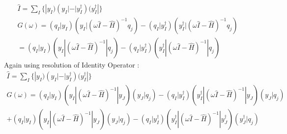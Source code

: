 \documentclass[11pt, oneside]{article}   	%
\begin{document}
\begin{equation*}\label{eq:resolution of identity}
  \begin{aligned}
    \hat I=\sum_I \{ |y_I)(y_I|-|y_I^\dagger)(y_I^\dagger|\}\\
    G(\omega)=(q_I|y_I)(y_I|(\omega \hat I - \hat H)^{-1}q_j) - (q_I|y_I^\dagger)(y_I^\dagger|(\omega \hat I - \hat H)^{-1}q_j)\\
    =(q_I|y_I)(y_I|(\omega \hat I - \hat H)^{-1}|q_j) - (q_I|y_I^\dagger)(y_I^\dagger|(\omega \hat I - \hat H)^{-1}|q_j)
  \end{aligned}
\end{equation*}
Again using resolution of Identity Operator : 
\begin{equation*}\label{eq:resolution of identity}
  \begin{aligned}
    \hat I=\sum_I \{ |y_I)(y_I|-|y_I^\dagger)(y_I^\dagger|\}\\
    G(\omega)=(q_I|y_I)(y_I|(\omega \hat I - \hat H)^{-1}|y_J)(y_J|q_j) - (q_I|y_I^\dagger)(y_I^\dagger|(\omega \hat I - \hat H)^{-1}|y_J)(y_J|q_j)\\
    +(q_I|y_I)(y_I|(\omega \hat I - \hat H)^{-1}|y_J)(y_J|q_j) - (q_I|y_I^\dagger)(y_I^\dagger|(\omega \hat I - \hat H)^{-1}|y_J^\dagger)(y_J^\dagger|q_j)
  \end{aligned}
\end{equation*}

\subsection{}
\end{document}
